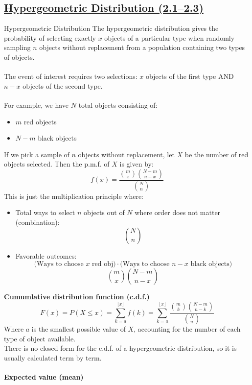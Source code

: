 ﻿\documentclass[12pt]{article}
\begin{document}
\subsection*{\underline{Hypergeometric Distribution (2.1--2.3)}}
\begin{definition}{Hypergeometric Distribution}
The hypergeometric distribution gives the probability of selecting exactly $x$ objects of a particular type when randomly sampling $n$ objects without replacement from a population containing two types of objects.\\\\
The event of interest requires two selections: $x$ objects of the first type AND $n-x$ objects of the second type.\\\\
For example, we have $N$ total objects consisting of:
\begin{itemize}
    \item $m$ red objects
    \item $N-m$ black objects
\end{itemize}
If we pick a sample of $n$ objects without replacement, let $X$ be the number of red objects selected. Then the p.m.f. of $X$ is given by:
\[\boxed{f(x) = \frac{\binom{m}{x}\binom{N-m}{n-x}}{\binom{N}{n}}}\]
This is just the multiplication principle where:
\begin{itemize}
    \item Total ways to select $n$ objects out of $N$ where order does not matter (combination):
    \[\binom{N}{n}\]
    \item Favorable outcomes:
    \[\text{(Ways to choose $x$ red obj)}\cdot\text{(Ways to choose $n-x$ black objects)}\]
    \[\binom{m}{x}\binom{N-m}{n-x}\]
\end{itemize}
\end{definition}
\textbf{Cumumlative distribution function (c.d.f.)}\\
\[
F(x)=P(X\leq x)=\sum_{k=a}^{\lfloor x \rfloor}f(k) = \sum_{k=a}^{\lfloor x \rfloor}\frac{\binom{m}{k}\binom{N-m}{n-k}}{\binom{N}{n}}
\]
Where \(a\) is the smallest possible value of \(X\), accounting for the number of each type of object available.\\
There is no closed form for the c.d.f. of a hypergeometric distribution, so it is usually calculated term by term.\\\\
\textbf{Expected value (mean)}\\
\end{document}
